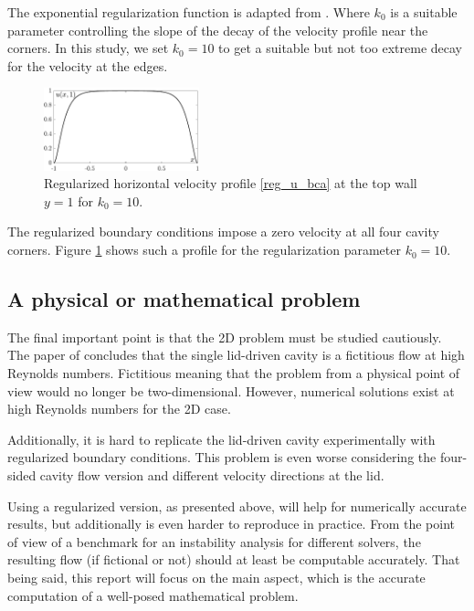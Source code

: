 The exponential regularization function is adapted from \citep{lopez2017}. Where
$k_0$ is a suitable parameter controlling the slope of the decay of the
velocity profile near the corners. In this study, we set $k_0=10$ to get a
suitable but not too extreme decay for the velocity at the edges. 

\begin{figure}[h!]
\begin{center}
  \includegraphics[width=0.4\textwidth]{figs/bc_profile.pdf}
\end{center}
\caption{\label{bc_profile} Regularized horizontal velocity profile
  \eqref{reg_u_bca} at the top wall $y=1$ for $k_0=10$.}
\end{figure}

The regularized boundary conditions impose a zero velocity at all four cavity
corners. Figure \ref{bc_profile} shows such a profile for the regularization
parameter $k_0=10$.

\subsection{A physical or mathematical problem}

The final important point is that the 2D problem must be studied cautiously.
The paper of \cite{eturk2009} concludes that the single lid-driven cavity is a
fictitious flow at high Reynolds numbers. Fictitious meaning that the problem
from a physical point of view would no longer be two-dimensional. However,
numerical solutions exist at high Reynolds numbers for the 2D case. 

Additionally, it is hard to replicate the lid-driven cavity experimentally with
regularized boundary conditions. This problem is even worse considering the
four-sided cavity flow version and different velocity directions at the lid.

Using a regularized version, as presented above, will help for numerically
accurate results, but additionally is even harder to reproduce in practice.
From the point of view of a benchmark for an instability analysis for
different solvers, the resulting flow (if fictional or not) should at least be
computable accurately. That being said, this report will focus on the main
aspect, which is the accurate computation of a well-posed mathematical problem. 
